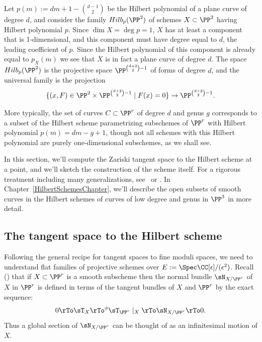 \begin{example}\label{Hilb for plane curves}
Let $p(m) := dm+1-{d-1\choose 2}$ be the Hilbert polynomial of a plane curve of degree $d$, and consider the family $Hilb_p(\PP^2)$ of schemes $X \subset \PP^{2}$ having Hilbert polynomial $p$. Since 
$\dim X = \deg p = 1$, $X$ has at least a component that is 1-dimensional, and this component must have degree
equal to $d$, the leading coefficient of $p$. Since the Hilbert polynomial  of this component is already equal
to $p_X(m)$ we see that $X$ is in fact a plane curve of degree $d$. The space $Hilb_{p}(\PP^2)$ is the projective space $\PP^{{d+2\choose 2}-1}$ of forms of degree $d$,
and the universal family is the projection 
$$
\{(x,F) \in \PP^2 \times \PP^{{d+2\choose 2}-1} \mid F(x) = 0\} \to \PP^{{d+2\choose 2}-1}.
$$

More typically, the set of curves $C \subset \PP^r$ of degree $d$ and genus $g$ corresponds to a subset of the Hilbert scheme parametrizing subschemes of $\PP^r$ with Hilbert polynomial $p(m) = dm - g + 1$, though not all schemes with this Hilbert polynomial are purely one-dimensional subschemes, as we shall see.
\end{example}
 
 In this section, we'll compute 
 the Zariski tangent space to the Hilbert scheme at a point,  and we'll sketch the construction of the scheme itself. For a rigorous treatment including many generalizations,  see~\cite{HomogHilbert} or \cite{MR2222646}. In Chapter~\ref{HilbertSchemesChapter}, we'll describe  the
 open subsets of smooth curves in the Hilbert schemes of curves of low degree and genus in $\PP^3$ in more detail. 

\subsection{The tangent space to the Hilbert scheme}\label{tan hilbert section}

Following the general recipe for tangent spaces to fine moduli spaces, we need to understand flat families
of projective schemes over $E := \Spec \CC[\eps]/(\eps^2)$. Recall (\cite[p.182]{Hartshorne1977}) that if $X\subset \PP^r$ is a smooth subscheme then
 the normal bundle $\sN_{X/\PP^r}$ of $X$ in $\PP^r$ is defined in terms of the tangent bundles
 of $X$ and $\PP^r$ by the exact sequence: 
$$
0\rTo \sT_X \rTo^{\phi} \sT_{\PP^r}\mid_X \rTo \sN_{X/\PP^r} \rTo 0.
$$
Thus a global section of 
$\sN_{X/\PP^r}$
can be thought of as an infinitesimal motion of $X$.

